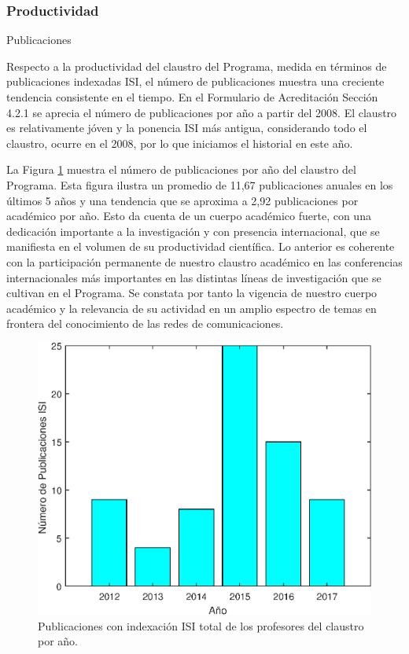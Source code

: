 \subsubsection{Productividad}

\noindent Publicaciones

Respecto a la productividad del claustro del Programa, medida
en términos de publicaciones indexadas ISI, el número de publicaciones muestra una creciente
tendencia consistente en el tiempo. En el Formulario de Acreditación Sección 4.2.1 se aprecia el
número de publicaciones por año a partir del 2008. El claustro es relativamente jóven y la ponencia 
ISI más antigua, considerando todo el claustro, ocurre en el 2008, por lo que iniciamos el historial en este año.

La Figura \ref{pub_isi} muestra el número de publicaciones por año del claustro del Programa. Esta figura ilustra
un promedio de 11,67 publicaciones anuales en los últimos 5 años y una tendencia que se aproxima
a 2,92 publicaciones por académico por año. Esto da cuenta de un cuerpo académico fuerte, con
una dedicación importante a la investigación y con presencia internacional, que se manifiesta en el
volumen de su productividad científica. Lo anterior es coherente con la participación permanente
de nuestro claustro académico en las conferencias internacionales más importantes en las distintas
líneas de investigación que se cultivan en el Programa. Se constata por tanto la vigencia de nuestro
cuerpo académico y la relevancia de su actividad en un amplio espectro de temas en frontera del
conocimiento de las redes de comunicaciones.

\begin{figure}[ht]
\centering
\includegraphics[width=0.7\columnwidth]{./pictures/publicaciones_ISI.eps}
\caption{Publicaciones con indexación ISI total de los profesores del claustro por año.}
\label{pub_isi}
\end{figure}

